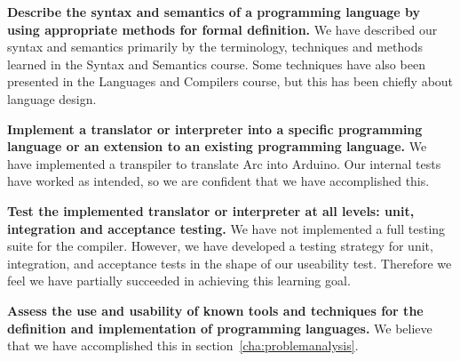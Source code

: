 

\textbf{Describe the syntax and semantics of a programming language by using appropriate methods for formal definition.} We have described our syntax and semantics primarily by the terminology, techniques and methods learned in the Syntax and Semantics course. Some techniques have also been presented in the Languages and Compilers course, but this has been chiefly about language design.

\textbf{Implement a translator or interpreter into a specific programming language or an extension to an existing programming language.} We have implemented a transpiler to translate Arc into Arduino. Our internal tests have worked as intended, so we are confident that we have accomplished this.

\textbf{Test the implemented translator or interpreter at all levels: unit, integration and acceptance testing.} We have not implemented a full testing suite for the compiler. However, we have developed a testing strategy for unit, integration, and acceptance tests in the shape of our useability test. Therefore we feel we have partially succeeded in achieving this learning goal.



\textbf{Assess the use and usability of known tools and techniques for the definition and implementation of programming languages.} We believe that we have accomplished this in section~\ref{cha:problemanalysis}.

